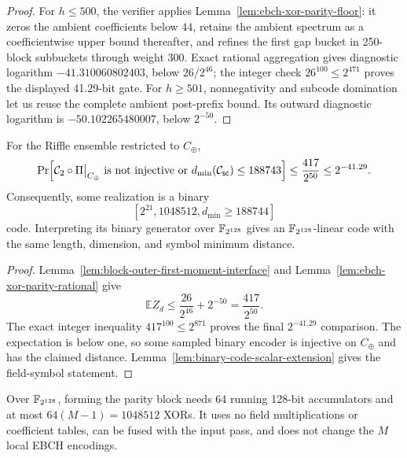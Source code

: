 \begin{proof}
For \(h\le500\), the verifier applies Lemma~\ref{lem:ebch-xor-parity-floor}:
it zeros the ambient coefficients below \(44\), retains the ambient spectrum
as a coefficientwise upper bound thereafter, and refines the first gap bucket
in 250-block subbuckets through weight \(300\).  Exact rational aggregation
gives diagnostic logarithm \(-41.310060802403\), below \(26/2^{46}\); the
integer check \(26^{100}\le2^{471}\) proves the displayed 41.29-bit gate.
For \(h\ge501\), nonnegativity and subcode domination let us reuse the complete
ambient post-prefix bound.  Its outward diagnostic logarithm is
\(-50.102265480007\), below \(2^{-50}\).
\end{proof}

\begin{theorem}
\label{thm:fullsplit-ebch-xor-parity-certificate-009}
For the Riffle ensemble restricted to \(C_{\oplus}\),
\[
 \Pr\Bigl[
 {\mathcal{C}_2}\circ\Pi\big|_{C_{\oplus}}\text{ is not injective}
  \ \text{or}\ d_{\min}({\mathcal{C}_{\mathsf{sc}}})\le188743
 \Bigr]
 \le \frac{417}{2^{50}}
 \le 2^{-41.29}.
\]
Consequently, some realization is a binary
\[
 [2^{21},1048512,d_{\min}\ge188744]
\]
code.  Interpreting its binary generator over \(\mathbb{F}_{2^{128}}\) gives an
\(\mathbb{F}_{2^{128}}\)-linear code with the same length, dimension, and symbol
minimum distance.
\end{theorem}

\begin{proof}
Lemma~\ref{lem:block-outer-first-moment-interface} and
Lemma~\ref{lem:ebch-xor-parity-rational} give
\[
 \mathbb E Z_d
 \le \frac{26}{2^{46}}+2^{-50}
 =\frac{417}{2^{50}}.
\]
The exact integer inequality \(417^{100}\le2^{871}\) proves the final
\(2^{-41.29}\) comparison.  The expectation is below one, so some sampled
binary encoder is injective on \(C_{\oplus}\) and has the claimed distance.
Lemma~\ref{lem:binary-code-scalar-extension} gives the field-symbol statement.
\end{proof}

\begin{remark}
Over \(\mathbb{F}_{2^{128}}\), forming the parity block needs 64 running 128-bit
accumulators and at most \(64(M-1)=1048512\) XORs.  It uses no field
multiplications or coefficient tables, can be fused with the input pass, and
does not change the \(M\) local EBCH encodings.
\end{remark}
